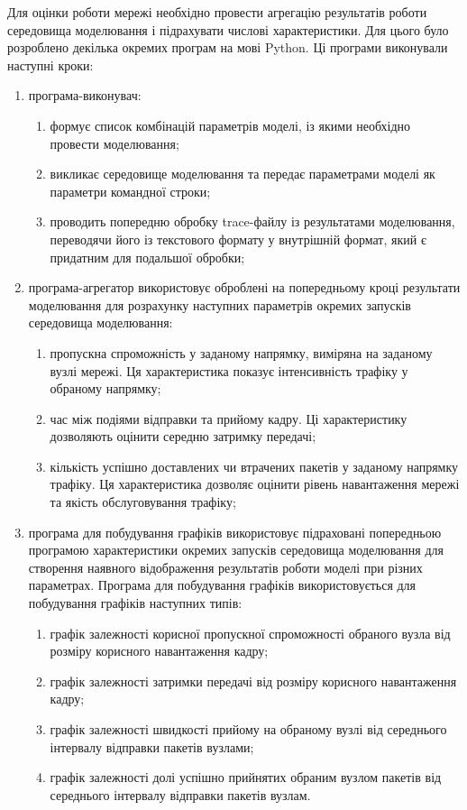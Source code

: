 \documentclass[a4paper,ukrainian,utf8,nocolumnsxix,floatsection,equationsection]{eskdtext}
\begin{document}
Для оцінки роботи мережі необхідно провести агрегацію результатів роботи середовища моделювання і підрахувати числові характеристики. Для цього було розроблено декілька окремих програм на мові Python. Ці програми виконували наступні кроки:
\begin{enumerate}
	\item програма-виконувач:
	\begin{enumerate}
		\item формує список комбінацій параметрів моделі, із якими необхідно провести моделювання;
		\item викликає середовище моделювання та передає параметрами моделі як параметри командної строки;
		\item проводить попередню обробку trace-файлу із результатами моделювання, переводячи його із текстового формату у внутрішній формат, який є придатним для подальшої обробки;
	\end{enumerate}

	\item програма-агрегатор використовує оброблені на попередньому кроці результати моделювання для розрахунку наступних параметрів окремих запусків середовища моделювання:
	\begin{enumerate}
		\item пропускна спроможність у заданому напрямку, виміряна на заданому вузлі мережі. Ця характеристика показує інтенсивність трафіку у обраному напрямку;
		\item час між подіями відправки та прийому кадру. Ці характеристику дозволяють оцінити середню затримку передачі;
		\item кількість успішно доставлених чи втрачених пакетів у заданому напрямку трафіку. Ця характеристика дозволяє оцінити рівень навантаження мережі та якість обслуговування трафіку;
	\end{enumerate}

	\item програма для побудування графіків використовує підраховані попередньою програмою характеристики окремих запусків середовища моделювання для створення наявного відображення результатів роботи моделі при різних параметрах. Програма для побудування графіків використовується для побудування графіків наступних типів:
	\begin{enumerate}
		\item графік залежності корисної пропускної спроможності обраного вузла від розміру корисного навантаження кадру;
		\item графік залежності затримки передачі від розміру корисного навантаження кадру;
		\item графік залежності швидкості прийому на обраному вузлі від середнього інтервалу відправки пакетів вузлами;
		\item графік залежності долі успішно прийнятих обраним вузлом пакетів від середнього інтервалу відправки пакетів вузлам.
	\end{enumerate}
\end{enumerate}
\end{document}
